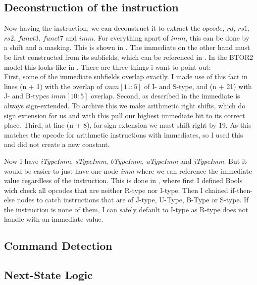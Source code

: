 \subsection{Deconstruction of the instruction}
Now having the instruction, we can deconstruct it to extract the $opcode$,
$rd$, $rs1$, $rs2$, $funct3$, $funct7$ and $imm$. For everything apart of
$imm$, this can be done by a shift and a masking. This is shown in
.
The immediate on the other hand must be first constructed from its subfields, which can be referenced in .
In the BTOR2 model this looks like in .
There are three things i want to point out:\\
First, some of the immediate subfields overlap exactly. I made use of this fact in lines (n + 1) with the overlap of $imm[11:5]$ of I- and S-type,  and (n + 21) with J- and B-types $imm[10:5]$ overlap.
Second, as described in  the immediate is always sign-extended. To archive this we make arithmetic right shifts, which do sign extension for us and with this pull our highest immediate bit to its correct place.
Third, at line (n + 8), for sign extension we must shift right by 19. As this matches the opcode for arithmetic instructions with immediates, so I used this and did not create a new constant.

Now I have \textsl{iTypeImm}, \textsl{sTypeImm}, \textsl{bTypeImm}, \textsl{uTypeImm} and \textsl{jTypeImm}.
But it would be easier to just have one node \textsl{imm} where we can reference the immediate value regardless of the instruction.
This is done in , where first I defined Bools wich check all opcodes that are neither R-type nor I-type.
Then I chained if-then-else nodes to catch instructions that are of J-type, U-Type, B-Type or S-type.
If the instruction is none of them, I can safely default to I-type as R-type does not handle with an immediate value.






\subsection{Command Detection}
\subsection{Next-State Logic}
